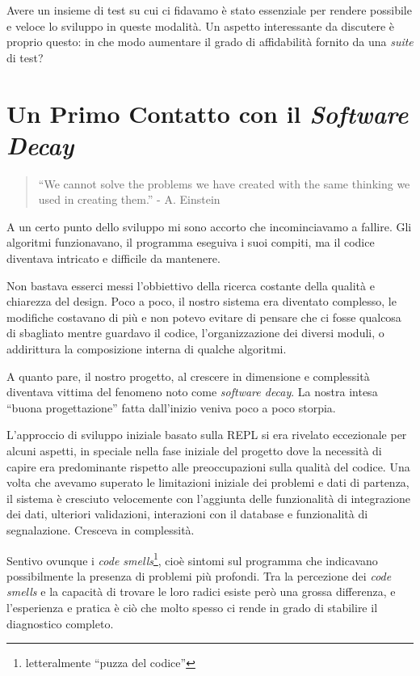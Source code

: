 \documentclass[12pt]{report}
\begin{document}
Avere un insieme di test su cui ci fidavamo è stato essenziale per rendere possibile e veloce lo sviluppo in queste modalità. Un aspetto interessante da discutere è proprio questo: in che modo aumentare il grado di affidabilità fornito da una \textit{suite} di test?



% 
\chapter{Un Primo Contatto con il \textit{Software Decay}}

\begin{quote}
``We cannot solve the problems we have created
with the same thinking we used in creating them.'' - A. Einstein
\end{quote}

A un certo punto dello sviluppo mi sono accorto che incominciavamo a fallire. 
Gli algoritmi funzionavano, il programma eseguiva i suoi compiti, ma il
codice diventava intricato e difficile da mantenere.

Non bastava esserci messi l'obbiettivo della ricerca costante della qualità e 
chiarezza del design. Poco a poco, il nostro sistema era diventato complesso, 
le modifiche costavano di più e non potevo evitare di pensare che ci fosse 
qualcosa di sbagliato mentre guardavo il codice, l'organizzazione dei diversi 
moduli, o addirittura la composizione interna di qualche algoritmi. 

A quanto pare, il nostro progetto, al crescere in dimensione e complessità 
diventava vittima del fenomeno noto come \textit{software decay}.
La nostra intesa ``buona progettazione'' fatta 
dall'inizio veniva poco a poco storpia.

L'approccio di sviluppo iniziale basato sulla REPL si era rivelato eccezionale 
per alcuni aspetti, in speciale nella fase iniziale del progetto dove la 
necessità di capire era predominante rispetto alle preoccupazioni sulla 
qualità del codice. Una volta che avevamo superato le limitazioni iniziale dei 
problemi e dati di partenza, il sistema è cresciuto velocemente con l'aggiunta 
delle funzionalità di integrazione dei dati, ulteriori validazioni, interazioni 
con il database e funzionalità di segnalazione. Cresceva in complessità. 

Sentivo ovunque i \textit{code smells}\footnote{
letteralmente ``puzza del codice''}, cioè sintomi sul programma che indicavano 
possibilmente la presenza di problemi più profondi. Tra la percezione dei 
\textit{code smells} e la capacità di trovare le loro radici esiste però una
grossa differenza, e l'esperienza e pratica è ciò che molto spesso ci rende
in grado di stabilire il diagnostico completo.
\end{document}
